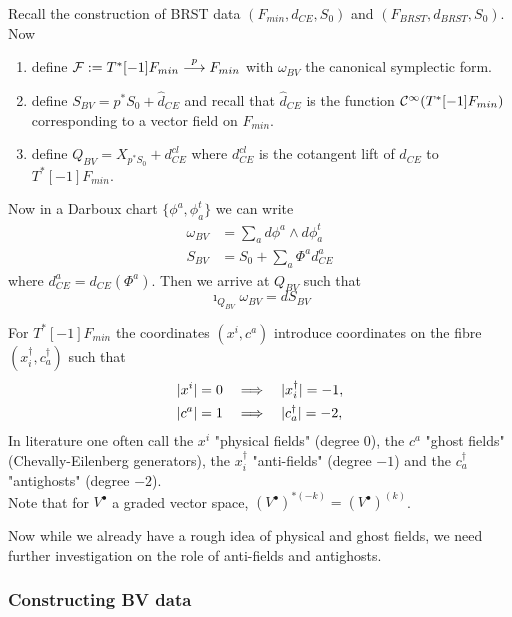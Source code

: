 \begin{example}[BV-BRST]
  Recall the construction of BRST data $(F_{min}, d_{CE}, S_0)$ and $(F_{BRST}, d_{BRST}, S_0)$. Now
  \begin{enumerate}
    \item define ${\mathcal{F}} := T^*[-1]F_{min} \overset{p}{\longrightarrow} F_{min}$ with $\omega_{BV}$ the canonical symplectic form.
    \item define $S_{BV} = p^* S_0 + \widehat{d}_{CE}$ and recall that $\widehat{d}_{CE}$ is the function $\mathcal{C}^{\infty}(T^*[-1]F_{min})$ corresponding to a vector field on $F_{min}$.
    \item define $Q_{BV} = X_{p^*S_0} + d_{CE}^{cl}$  where $d_{CE}^{cl}$ is the cotangent lift of $d_{CE}$ to $T^*[-1]F_{min}$.
  \end{enumerate}
  Now in a Darboux chart $\{\phi^a, \phi^t_a\}$ we can write
  \begin{align}
    \omega_{BV} &= \sum_a d\phi^a \wedge d\phi^t_a \\
    S_{BV} &= S_0 + \sum_a \Phi^a d^a_{CE}
  \end{align}
  where $d^a_{CE} = d_{CE}(\Phi^a)$. Then we arrive at $Q_{BV}$ such that
  \begin{equation}
    \imath_{Q_{BV}} \omega_{BV} = dS_{BV}
  \end{equation}
\end{example}

\begin{notation}
  For $T^*[-1]F_{min}$ the coordinates $(x^i, c^a)$ introduce coordinates on the fibre $(x^\dagger_i, c^\dagger_a)$ such that
  \begin{align*}
    |x^i| &= 0 \quad \Longrightarrow \quad |x_i^\dagger| = -1, \\
    |c^a| &= 1 \quad \Longrightarrow \quad |c_a^\dagger| = -2,
  \end{align*}
  In literature one often call the $x^i$ "physical fields" (degree $0$), the $c^a$ "ghost fields" (Chevally-Eilenberg generators), the $x_i^\dagger$ "anti-fields" (degree $-1$) and the $c_a^\dagger$ "antighosts" (degree $-2$).\\

  Note that for $V^\bullet$ a graded vector space, $(V^\bullet)^{* (-k)} = (V^\bullet)^{(k)}$.
\end{notation}

Now while we already have a rough idea of physical and ghost fields, we need further investigation on the role of anti-fields and antighosts.


\subsubsection{Constructing BV data}

